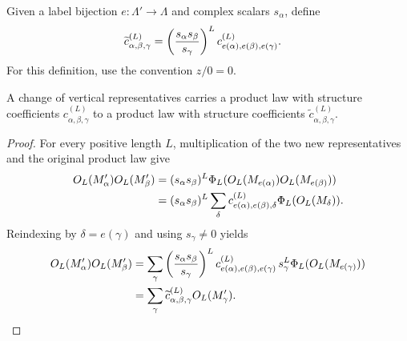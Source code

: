 \begin{definition}%
    \label{def:mpdo_vertical_bnt_transported_coefficients}
    \leanok
    Given a label bijection $e:\Lambda'\to\Lambda$ and complex scalars $s_\alpha$,
    define
    \begin{align}
        \widetilde c^{(L)}_{\alpha,\beta,\gamma}
         & =\left(\frac{s_\alpha s_\beta}{s_\gamma}\right)^L
        c^{(L)}_{e(\alpha),e(\beta),e(\gamma)}.
        \notag
    \end{align}
    For this definition, use the convention $z/0=0$.
\end{definition}

\begin{lemma}%
    \label{thm:mpdo_vertical_bnt_product_transport}
    \leanok
    A change of vertical representatives carries a product law with
    structure coefficients $c^{(L)}_{\alpha,\beta,\gamma}$ to a product law
    with structure coefficients $\widetilde c^{(L)}_{\alpha,\beta,\gamma}$.
\end{lemma}
\begin{proof}\leanok
    For every positive length $L$, multiplication of the two new
    representatives and the original product law give
    \begin{align}
        O_L(M'_\alpha)O_L(M'_\beta)
         & =(s_\alpha s_\beta)^L
        \Phi_L(O_L(M_{e(\alpha)})O_L(M_{e(\beta)}))
        \notag                   \\
         & =(s_\alpha s_\beta)^L
        \sum_\delta c^{(L)}_{e(\alpha),e(\beta),\delta}
        \Phi_L(O_L(M_\delta)).
        \notag
    \end{align}
    Reindexing by $\delta=e(\gamma)$ and using $s_\gamma\ne0$ yields
    \begin{align}
        O_L(M'_\alpha)O_L(M'_\beta)
         & =\sum_\gamma
        \left(\frac{s_\alpha s_\beta}{s_\gamma}\right)^L
        c^{(L)}_{e(\alpha),e(\beta),e(\gamma)}
        \,s_\gamma^L\Phi_L(O_L(M_{e(\gamma)}))
        \notag          \\
         & =\sum_\gamma
        \widetilde c^{(L)}_{\alpha,\beta,\gamma}O_L(M'_\gamma).
        \notag
    \end{align}
\end{proof}

